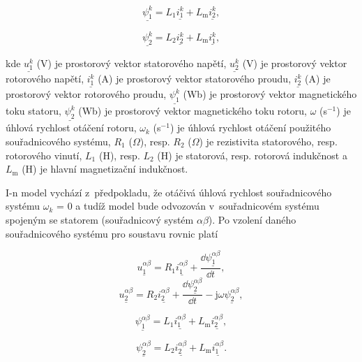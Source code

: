 \documentclass[a4paper, twoside, 11pt]{article}
\begin{document}
		\begin{equation}
			\underline{\psi_1^{k}} = L_1 \underline{i_1^{k}} + L_\text{m} \underline{i_2^{k}},
		\end{equation}
	
		\begin{equation}
			\underline{\psi_2^{k}} = L_2 \underline{i_2^{k}} + L_\text{m} \underline{i_1^{k}},
		\end{equation}

		kde $\underline{u_{1}^{k}}$ (V) je prostorový vektor statorového napětí, $\underline{u_{2}^{k}}$ (V) je prostorový vektor rotorového napětí, $\underline{i_{1}^{k}}$ (A) je prostorový vektor statorového proudu, $\underline{i_{2}^{k}}$ (A) je prostorový vektor rotorového proudu, $\underline{\psi_1^{k}}$ (Wb) je prostorový vektor magnetického toku statoru, $\underline{\psi_2^{k}}$ (Wb) je prostorový vektor magnetického toku rotoru, $\omega$ (s$^{-1}$) je úhlová rychlost otáčení rotoru, $\omega_k$ (s$^{-1}$) je úhlová rychlost otáčení použitého souřadnicového systému, $R_1$ ($\Omega$), resp. $R_2$ ($\Omega$) je rezistivita statorového, resp. rotorového vinutí, $L_1$ (H), resp. $L_2$ (H) je statorová, resp. rotorová indukčnost a $L_\text{m}$ (H) je hlavní magnetizační indukčnost.\par
		I-n model vychází z~předpokladu, že otáčivá úhlová rychlost souřadnicového systému $\omega_k$ = 0 a tudíž model bude odvozován v~souřadnicovém systému spojeným se statorem (souřadnicový systém $\alpha \beta$). Po vzolení daného souřadnicového systému pro soustavu rovnic platí

		\begin{equation}
			\underline{u_{1}^{\alpha \beta}} = R_1 \underline{i_{1}^{\alpha \beta}} + \frac{\dd{\underline{\psi_1^{\alpha \beta}}}}{\dd{t}},
		\end{equation}
		\begin{equation}\label{eq:alphabeta-napeti-rotor-rovnice-i-n-model}
			\underline{u_{2}^{\alpha \beta}} = R_2 \underline{i_{2}^{\alpha \beta}} + \frac{\dd{\underline{\psi_2^{\alpha \beta}}}}{\dd{t}} - \text{j} \omega \underline{\psi_2^{\alpha \beta}},
		\end{equation}
	
		\begin{equation}
			\underline{\psi_1^{\alpha \beta}} = L_1 \underline{i_1^{\alpha \beta}} + L_\text{m} \underline{i_2^{\alpha \beta}},
		\end{equation}
	
		\begin{equation}\label{eq:alphabeta-tok-rotor-rovnice-i-n-model}
			\underline{\psi_2^{\alpha \beta}} = L_2 \underline{i_2^{\alpha \beta}} + L_\text{m} \underline{i_1^{\alpha \beta}}.
		\end{equation}
\end{document}
